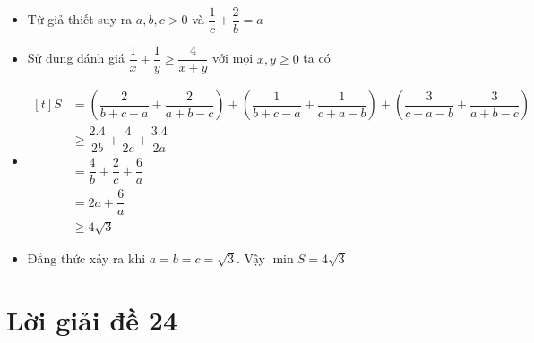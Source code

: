 \lgi 
\begin{itemize}[label=,leftmargin=*]
\item Từ giả thiết suy ra $a,b,c>0$ và $\dfrac{1}{c}+\dfrac{2}{b}=a$
\item Sử dụng đánh giá $\dfrac{1}{x}+\dfrac{1}{y}\ge \dfrac{4}{x+y}$ với mọi $x,y\ge 0$ ta có
\item $\begin{aligned}[t]S&=\left( \dfrac{2}{b+c-a}+\dfrac{2}{a+b-c} \right)+\left(\dfrac{1}{b+c-a}+\dfrac{1}{c+a-b} \right) +\left(\dfrac{3}{c+a-b}+\dfrac{3}{a+b-c} \right)\\ 
&\ge \dfrac{2.4}{2b}+\dfrac{4}{2c}+\dfrac{3.4}{2a}\\
&=\dfrac{4}{b}+\dfrac{2}{c}+\dfrac{6}{a}\\
&=2a+\dfrac{6}{a} \\
&\ge 4\sqrt{3} 
\end{aligned}$
\item Đẳng thức xảy ra khi $a=b=c=\sqrt{3}$. Vậy $\min S=4\sqrt{3}$
\end{itemize}

\section{Lời giải đề 24}

